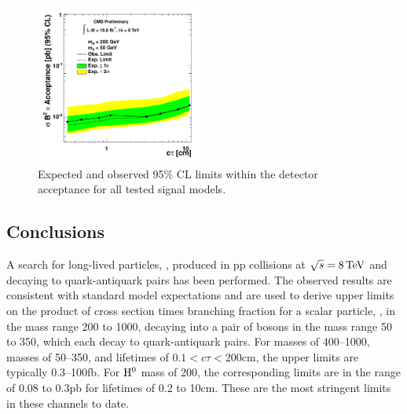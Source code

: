 \begin{figure}[htbp]
\includegraphics[width=0.49\textwidth]{plots/limits/200_50ea.pdf}

\caption{Expected and observed 95\% CL limits within the detector acceptance for all tested signal models.\label{fig:limitsacceptance}}
\end{figure}

\subsection{Conclusions}
\label{subsec:conclusions}

A search for long-lived particles, \X, produced in pp collisions at $\sqrt{s} = 8\,\text{Te\hspace{-.08em}V}$ and decaying
to quark-antiquark pairs has been performed.
The observed results are consistent with standard model expectations and are used to derive upper
limits on the product of cross section times branching fraction for a scalar particle,
 \Higgs, in the mass range 200 to 1000\GeV, decaying into a pair of \X bosons in the mass
range 50 to 350\GeV, which each decay to quark-antiquark pairs. For \Higgs masses of 400--1000\GeV, \X
masses of 50--350\GeV, and \X lifetimes of $0.1<c\tau<200$\:cm, the upper limits are typically 0.3--100\:fb.
 For $\mathrm{H}^{0}$ mass of 200\GeV, the corresponding limits are in the range of 0.08 to 0.3\:pb for \X
lifetimes of 0.2 to 10\:cm. These are the most stringent limits in these channels to date.
